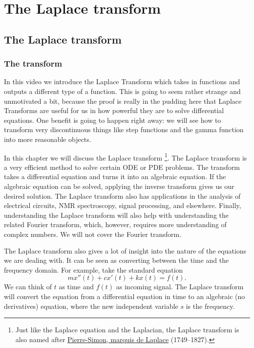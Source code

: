 \chapter{The Laplace transform} \label{LT:chapter}


\section{The Laplace transform}
\label{laplace:section}

\subsection{The transform}
\begin{video}
In this video we introduce the Laplace Transform which takes in functions and outputs a different type of a function. This is going to seem rather strange and unmotivated a bit, because the proof is really in the pudding here that Laplace Transforms are useful for us in how powerful they are to solve differential equations. One benefit is going to happen right away: we will see how to transform very discontinuous things like step functions and the gamma function into more reasonable objects.   
\end{video}
In this chapter we will discuss the Laplace transform%
\footnote{Just like the Laplace equation and the Laplacian, the Laplace
transform is also named after 
\href{https://en.wikipedia.org/wiki/Laplace}{Pierre-Simon, marquis de Laplace}
(1749--1827).}.
The Laplace transform
is a very efficient method to solve certain ODE or PDE problems.
The transform takes a differential equation and turns it into
an algebraic equation.  If the algebraic equation can be solved, applying the
inverse transform gives us our desired solution.
The Laplace transform also has applications in
the analysis of 
electrical circuits, NMR spectroscopy, signal processing, and elsewhere.
Finally,
understanding the Laplace
transform will also help with understanding the related Fourier transform,
which, however, requires more
understanding of complex numbers.  We will not cover the Fourier transform.

The Laplace transform also gives a lot of insight into the nature of the
equations we are dealing with.  It can be seen as converting between the time
and the frequency domain.  For example, take the standard equation
\begin{equation*}
m x''(t) + c x'(t) + k x(t) = f(t) .
\end{equation*}
We can think of $t$ as time and $f(t)$ as incoming signal.  The Laplace
transform will convert the equation from a differential equation in time to
an algebraic (no derivatives) equation, where the new independent variable
$s$ is the frequency.

